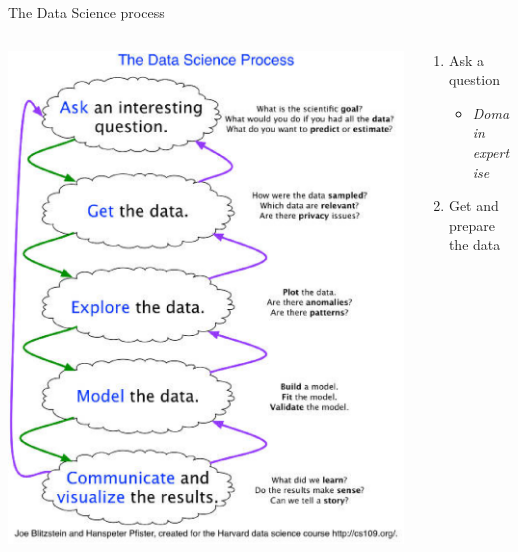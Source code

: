 \documentclass[11pt,xcolor=svgnames]{beamer}
\begin{document}
\begin{frame}{The Data Science process}
  \begin{columns}[t]
    \begin{column}[t]{0.55\textwidth}
      \begin{block}{}
        \begin{center}
          \includegraphics[scale=.3]{figs/data-science-process}
        \end{center}
      \end{block}
    \end{column}
    \begin{column}[t]{.4\textwidth}
      \begin{footnotesize}
        \begin{enumerate}
        \item Ask a question
          \begin{itemize}
          \item {\em \scriptsize Domain expertise}
          \end{itemize}
        \item Get and prepare the data

\end{enumerate}
\end{footnotesize}
\end{column}
\end{columns}
\end{frame}
\end{document}
